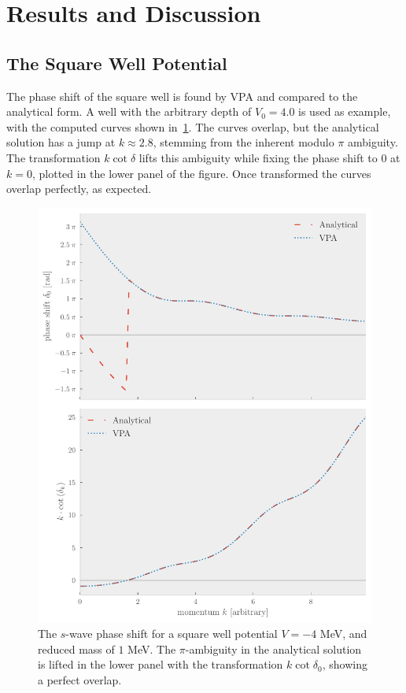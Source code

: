 \section{Results and Discussion}\label{sec:Results}

\subsection{The Square Well Potential}
The phase shift of the square well is found by VPA and compared to the analytical form.
A well with the arbitrary depth of \(V_{0}=4.0\) is used as
example, with the computed curves shown in~\cref{fig:analyticalcot}. The curves
overlap, but the analytical solution
has a jump at \(k\approx 2.8\), stemming from the inherent modulo \(\pi\)
ambiguity. The transformation \(k\cot\delta\) lifts this ambiguity while fixing
the phase shift to \(0\) at \(k=0\), plotted in the lower panel of the figure.
Once transformed the curves overlap perfectly, as expected.

\begin{figure}[ht!]
  \showthe\columnwidth %
  \showthe\textwidth %
  \centering
  \includegraphics[]{Figures/analytical_cot.pdf}
  \caption{\label{fig:analyticalcot}The \(s\)-wave phase shift for a square well
    potential \(V=-4\) MeV, and reduced mass of \(1\) MeV. The \(\pi\)-ambiguity
  in the analytical solution is lifted in the lower panel with the
  transformation \(k\cot{\delta_{0}}\), showing a perfect overlap.}
\end{figure}


